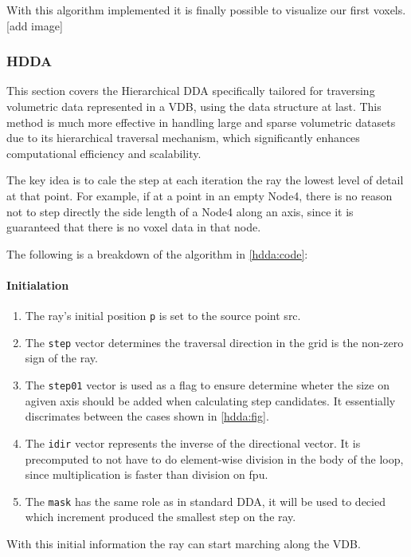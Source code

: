 With this algorithm implemented it is finally possible to visualize our first voxels.
[add image]

\subsubsection{HDDA}
This section covers the Hierarchical DDA specifically tailored for traversing volumetric data represented in a VDB, using the data structure at last. This method is much more effective in handling large and sparse volumetric datasets due to its hierarchical traversal mechanism, which significantly enhances computational efficiency and scalability.

The key idea is to cale the step at each iteration the ray the lowest level of detail at that point. For example, if at a point in an empty Node4, there is no reason not to step directly the side length of a Node4 along an axis, since it is guaranteed that there is no voxel data in that node.

The following is a breakdown of the algorithm in \cref{hdda:code}:
\paragraph{Initialation}
\begin{enumerate}
  \item The ray's initial position \texttt{p} is set to the source point src.
  \item The \texttt{step} vector determines the traversal direction in the grid is the non-zero sign of the ray.
  \item The \texttt{step01} vector is used as a flag to ensure determine wheter the size on agiven axis should be added when calculating step candidates.
        It essentially discrimates between the cases shown in \cref{hdda:fig}.
  \item The \texttt{idir} vector represents the inverse of the directional vector.
        It is precomputed to not have to do element-wise division in the body of the loop, since multiplication is faster than division on \acrshort{fpu}.
  \item The \texttt{mask} has the same role as in standard DDA, it will be used to decied which increment produced the smallest step on the ray.
\end{enumerate}
With this initial information the ray can start marching along the VDB.

